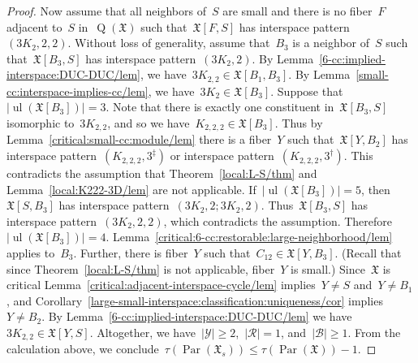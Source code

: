 \documentclass[english,a4paper]{article}
\theoremstyle{plain}
\theoremstyle{definition}
\newcommand{\abs}[1]{| #1 |}
\newcommand{\coherentConfig}{\ensuremath{\mathfrak{X}}}
\newcommand{\interspace}[2]{\ensuremath{\coherentConfig[#1,#2]}}
\newcommand{\inducedCC}[1]{\ensuremath{\coherentConfig[#1]}}
\DeclareMathOperator*{\ul}{ul}
\DeclareMathOperator*{\Quotient}{Q}
\newcommand{\quotientGraph}[1]{\ensuremath{\Quotient(#1)}}
\DeclareMathOperator{\parameters}{Par}
\newcommand{\ipsixMatching}             {\ensuremath{(\disjointCliques{3}{2},2)}}
\newcommand{\ipsixMatchingTwice}        {\ensuremath{(\disjointCliques{3}{2},2,2)}}
\newcommand{\ipsixMatchingMatching}     {\ensuremath{(\disjointCliques{3}{2},2;\disjointCliques{3}{2},2)}}
\newcommand{\ipsixMatchingComplement} {\ensuremath{(\clique{2,2,2},3^\dag)}}
\newcommand{\ipsixMatchingComplementD}{\ensuremath{(\clique{2,2,2},3^\ddag)}}
\newcommand{\clique}[1]{\ensuremath{K_{#1}}}
\newcommand{\cycle}[1]{\ensuremath{C_{#1}}}
\newcommand{\disjointCliques}[2]{\ensuremath{#1 \clique{#2}}}
\begin{document}
\begin{proof}
    Now assume that all neighbors of~$S$ are small and there is no fiber~$F$ adjacent to~$S$ in~$\quotientGraph{\coherentConfig}$ such that~$\interspace{F}{S}$ has interspace pattern~$\ipsixMatchingTwice$.
    Without loss of generality, assume that~$B_3$ is a neighbor of~$S$ such that~$\interspace{B_3}{S}$ has interspace pattern~$\ipsixMatching$.
    By Lemma~\ref{6-cc:implied-interspace:DUC-DUC/lem}, we have~$\disjointCliques{3}{2,2} \in \interspace{B_1}{B_3}$.
    By Lemma~\ref{small-cc:interspace-implies-cc/lem}, we have~$\disjointCliques{3}{2} \in \inducedCC{B_3}$.
    Suppose that~$|\ul(\inducedCC{B_3})| = 3$.
    Note that there is exactly one constituent in~$\interspace{B_3}{S}$ isomorphic to~$\disjointCliques{3}{2,2}$, and so we have~$\clique{2,2,2} \in \inducedCC{B_3}$.
    Thus by Lemma~\ref{critical:small-cc:module/lem} there is a fiber~$Y$ such that~$\interspace{Y}{B_2}$ has interspace pattern~$\ipsixMatchingComplementD$ or interspace pattern~$\ipsixMatchingComplement$.
    This contradicts the assumption that Theorem~\ref{local:L-S/thm} and Lemma~\ref{local:K222-3D/lem} are not applicable.
    If~$|\ul(\inducedCC{B_3})| = 5$, then~$\interspace{S}{B_3}$ has interspace pattern~$\ipsixMatchingMatching$.
    Thus~$\interspace{B_3}{S}$ has interspace pattern~$\ipsixMatchingTwice$, which contradicts the assumption.
    Therefore~$|\ul(\inducedCC{B_3})| = 4$.
    Lemma~\ref{critical:6-cc:restorable:large-neighborhood/lem} applies to~$B_3$.
    Further, there is fiber~$Y$ such that~$\cycle{12} \in \interspace{Y}{B_3}$. (Recall that since Theorem~\ref{local:L-S/thm} is not applicable, fiber~$Y$ is small.)
    Since~$\coherentConfig$ is critical Lemma~\ref{critical:adjacent-interspace-cycle/lem} implies~$Y \neq S$ and~$Y \neq B_1$, and Corollary~\ref{large-small-interspace:classification:uniqueness/cor} implies~$Y \neq B_2$.
    By Lemma~\ref{6-cc:implied-interspace:DUC-DUC/lem} we have~$\disjointCliques{3}{2,2} \in \interspace{Y}{S}$.
    Altogether, we have~$|\mathcal{Y}| \geq 2$,~$\abs{\mathcal{R}} = 1$, and~$\abs{\mathcal{B}} \geq 1$.
    From the calculation above, we conclude~$\tau(\parameters(\coherentConfig_s)) \leq \tau(\parameters(\coherentConfig))- 1$.


\end{proof}
\end{document}
